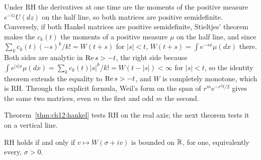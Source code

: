Under RH the derivatives at one time are the moments of the positive measure $e^{-tz}U(dz)$ on the half line, so both matrices are positive semidefinite. Conversely, if both Hankel matrices are positive semidefinite, Stieltjes' theorem makes the $c_k(t)$ the moments of a positive measure $\mu$ on the half line, and since $\sum_kc_k(t)(-s)^k/k!=W(t+s)$ for $|s|<t$, $W(t+s)=\int e^{-sx}\mu(dx)$ there. Both sides are analytic in $\operatorname{Re} s>-t$, the right side because $\int e^{|s|x}\mu(dx)=\sum_kc_k(t)|s|^k/k!=W(t-|s|)<\infty$ for $|s|<t$, so the identity theorem extends the equality to $\operatorname{Re} s>-t$, and $W$ is completely monotone, which is RH. Through the explicit formula, Weil's form on the span of $r^me^{-r^2t/2}$ gives the same two matrices, even $m$ the first and odd $m$ the second.

Theorem~\ref{thm:ch12:hankel} tests RH on the real axis; the next theorem tests it on a vertical line.

\begin{theorem}\label{tx:thm:vertical}
RH holds if and only if $v\mapsto W(\sigma+iv)$ is bounded on $\mathbb{R}$, for one, equivalently every, $\sigma>0$.
\end{theorem}

